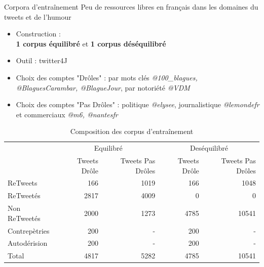 \documentclass{beamer}
\begin{document}
\begin{frame}[allowframebreaks]{Corpora d'entraînement}
Peu de ressources libres en français dans les domaines du tweets et de l'humour
\begin{itemize}

\item Construction :\\ \textbf{1 corpus équilibré} et \textbf{1 corpus déséquilibré}
\item Outil : twitter4J
\item Choix des comptes "Drôles" : par mots clés \textit{@100\_blagues, @BlaguesCarambar, @BlagueJour}, par notoriété \textit{@VDM}
\item Choix des comptes "Pas Drôles" : politique \textit{@elysee}, journalistique \textit{@lemondefr} et commerciaux \textit{@m6, @nantesfr}
\end{itemize}




\begin{table}
\centering
\tiny
	\begin{tabular}{lrrrr}
	\toprule
	& \multicolumn{2}{c}{Equilibré}  & \multicolumn{2}{c}{Deséquilibré}\\
	\cmidrule(r){2-3} \cmidrule(r){4-5}

	& Tweets Drôle & Tweets Pas Drôles &  Tweets Drôle & Tweets Pas Drôles \\
	\midrule
	 ReTweets & 166 & 1019 & 166 & 1048 \\
	
	 ReTweetés & 2817 & 4009 & 0 & 0 \\
	
	Non ReTweetés & 2000 & 1273 & 4785 & 10541 \\
	
	Contrepètries & 200 & - & 200 & - \\
	Autodérision & 200 & - & 200 & - \\
	 \midrule
	Total & 4817 & 5282 & 4785 &  10541 \\
	\bottomrule
	\end{tabular}
\caption{Composition des corpus d'entraînement}
\label{corpus}
\end{table}

\end{frame}
\end{document}
